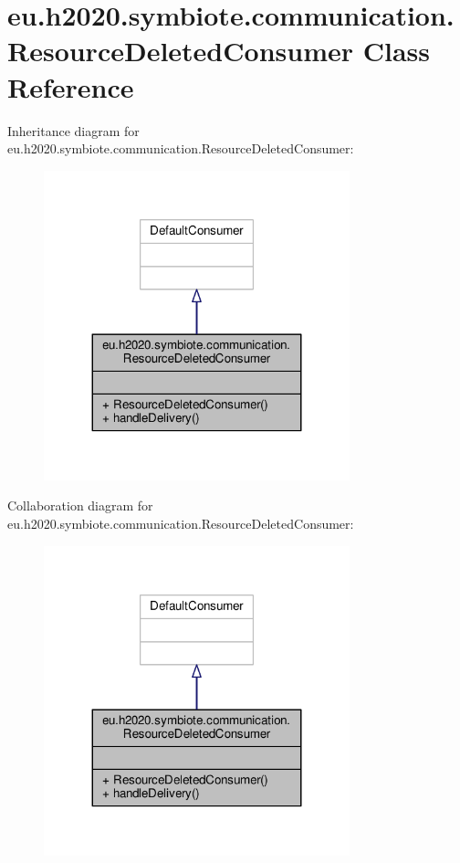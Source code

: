 \hypertarget{classeu_1_1h2020_1_1symbiote_1_1communication_1_1ResourceDeletedConsumer}{}\section{eu.\+h2020.\+symbiote.\+communication.\+Resource\+Deleted\+Consumer Class Reference}
\label{classeu_1_1h2020_1_1symbiote_1_1communication_1_1ResourceDeletedConsumer}


Inheritance diagram for eu.\+h2020.\+symbiote.\+communication.\+Resource\+Deleted\+Consumer\+:
\nopagebreak
\begin{figure}[H]
\begin{center}
\leavevmode
\includegraphics[width=251pt]{classeu_1_1h2020_1_1symbiote_1_1communication_1_1ResourceDeletedConsumer__inherit__graph}
\end{center}
\end{figure}


Collaboration diagram for eu.\+h2020.\+symbiote.\+communication.\+Resource\+Deleted\+Consumer\+:
\nopagebreak
\begin{figure}[H]
\begin{center}
\leavevmode
\includegraphics[width=251pt]{classeu_1_1h2020_1_1symbiote_1_1communication_1_1ResourceDeletedConsumer__coll__graph}
\end{center}
\end{figure}

